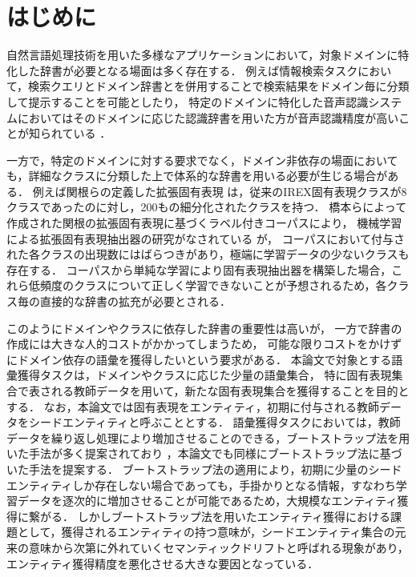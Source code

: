 \documentclass[japanese]{jnlp_1.4}
\begin{document}
\maketitle

\section{はじめに}
自然言語処理技術を用いた多様なアプリケーションにおいて，対象ドメインに特化した辞書が必要となる場面は多く存在する．
例えば情報検索タスクにおいて，検索クエリとドメイン辞書とを併用することで検索結果をドメイン毎に分類して提示することを可能としたり，
特定のドメインに特化した音声認識システムにおいてはそのドメインに応じた認識辞書を用いた方が音声認識精度が高いことが知られている \cite{廣嶋2004}．


一方で，特定のドメインに対する要求でなく，ドメイン非依存の場面においても，詳細なクラスに分類した上で体系的な辞書を用いる必要が生じる場合がある．
例えば関根らの定義した拡張固有表現 \cite{sekine2008extended} は，従来のIREX固有表現クラスが8クラスであったのに対し，200もの細分化されたクラスを持つ．
橋本らによって作成された関根の拡張固有表現に基づくラベル付きコーパスにより，
機械学習による拡張固有表現抽出器の研究がなされている \cite{橋本08,橋本10} が，
コーパスにおいて付与された各クラスの出現数にはばらつきがあり，極端に学習データの少ないクラスも存在する．
コーパスから単純な学習により固有表現抽出器を構築した場合，これら低頻度のクラスについて正しく学習できないことが予想されるため，各クラス毎の直接的な辞書の拡充が必要とされる．


このようにドメインやクラスに依存した辞書の重要性は高いが，
一方で辞書の作成には大きな人的コストがかかってしまうため，
可能な限りコストをかけずにドメイン依存の語彙を獲得したいという要求がある．
本論文で対象とする語彙獲得タスクは，ドメインやクラスに応じた少量の語彙集合，
特に固有表現集合で表される教師データを用いて，新たな固有表現集合を獲得することを目的とする．
なお，本論文では固有表現をエンティティ，初期に付与される教師データをシードエンティティと呼ぶこととする．
語彙獲得タスクにおいては，教師データを繰り返し処理により増加させることのできる，ブートストラップ法を用いた手法が多く提案されており \cite{pantel2006espresso,bellare2007lightly}，本論文でも同様にブートストラップ法に基づいた手法を提案する．
ブートストラップ法の適用により，初期に少量のシードエンティティしか存在しない場合であっても，手掛かりとなる情報，すなわち学習データを逐次的に増加させることが可能であるため，大規模なエンティティ獲得に繋がる．
しかしブートストラップ法を用いたエンティティ獲得における課題として，獲得されるエンティティの持つ意味が，シードエンティティ集合の元来の意味から次第に外れていくセマンティックドリフトと呼ばれる現象があり，エンティティ獲得精度を悪化させる大きな要因となっている．
\end{document}
